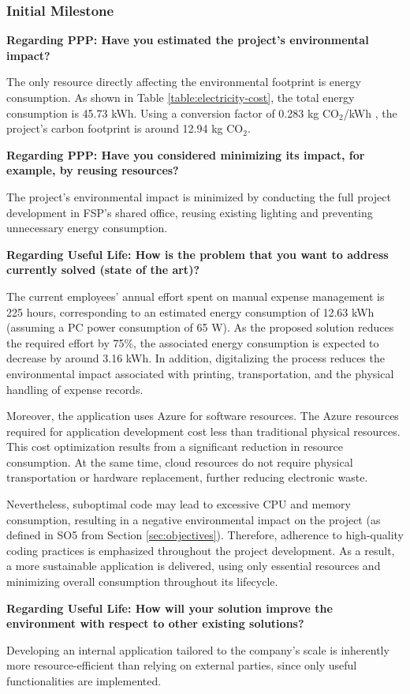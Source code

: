 \subsubsection{Initial Milestone}



\textbf{Regarding PPP: Have you estimated the project's environmental impact? }
\vspace{-5pt}

The only resource directly affecting the environmental footprint is energy consumption. As shown in Table \ref{table:electricity-cost}, the total energy consumption is 45.73 kWh. Using a conversion factor of 0.283 kg CO$_2$/kWh \cite{electricity-carbon}, the project's carbon footprint is around 12.94 kg CO$_2$.  


\textbf{Regarding PPP: Have you considered minimizing its impact, for example, by reusing resources? }
\vspace{-5pt}

The project's environmental impact is minimized by conducting the full project development in FSP's shared office, reusing existing lighting and preventing unnecessary energy consumption. 


\textbf{Regarding Useful Life: How is the problem that you want to address currently solved (state of the art)?}
\vspace{-5pt}

The current employees' annual effort spent on manual expense management is 225 hours, corresponding to an estimated energy consumption of 12.63 kWh (assuming a PC power consumption of 65 W). As the proposed solution reduces the required effort by 75\%, the associated energy consumption is expected to decrease by around 3.16 kWh. In addition, digitalizing the process reduces the environmental impact associated with printing, transportation, and the physical handling of expense records.

Moreover, the application uses Azure for software resources. The Azure resources required for application development cost less than traditional physical resources. This cost optimization results from a significant reduction in resource consumption. At the same time, cloud resources do not require physical transportation or hardware replacement, further reducing electronic waste. 

Nevertheless, suboptimal code may lead to excessive CPU and memory consumption, resulting in a negative environmental impact on the project (as defined in SO5 from Section \ref{sec:objectives}). Therefore, adherence to high-quality coding practices is emphasized throughout the project development. As a result, a more sustainable application is delivered, using only essential resources and minimizing overall consumption throughout its lifecycle.



\textbf{Regarding Useful Life: How will your solution improve the environment with respect to other existing solutions? }
\vspace{-5pt}

Developing an internal application tailored to the company's scale is inherently more resource-efficient than relying on external parties, since only useful functionalities are implemented. 
